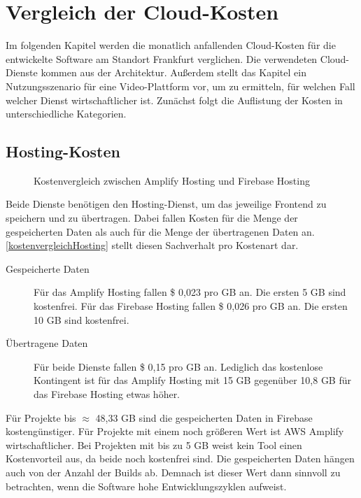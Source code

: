 \chapter{Vergleich der Cloud-Kosten}

Im folgenden Kapitel werden die monatlich anfallenden Cloud-Kosten \autocite{awsPricing} \autocite{gcpPricing} für die entwickelte Software am Standort Frankfurt verglichen. Die verwendeten Cloud-Dienste kommen aus der Architektur. Außerdem stellt das Kapitel ein Nutzungsszenario für eine Video-Plattform vor, um zu ermitteln, für welchen Fall welcher Dienst wirtschaftlicher ist. Zunächst folgt die Auflistung der Kosten in unterschiedliche Kategorien.

\section{Hosting-Kosten}

\begin{figure}%
    \centering
    \qquad
    \caption{Kostenvergleich zwischen Amplify Hosting und Firebase Hosting}%
    \label{kostenvergleichHosting}%
\end{figure}

Beide Dienste benötigen den Hosting-Dienst, um das jeweilige Frontend zu speichern und zu übertragen. Dabei fallen Kosten für die Menge der gespeicherten Daten als auch für die Menge der übertragenen Daten an. \autoref{kostenvergleichHosting} stellt diesen Sachverhalt pro Kostenart dar.

\begin{description}
  \item[Gespeicherte Daten] Für das Amplify Hosting fallen \$ 0,023 pro GB an. Die ersten 5 GB sind kostenfrei. Für das Firebase Hosting fallen \$ 0,026 pro GB an. Die ersten 10 GB sind kostenfrei.
  \item[Übertragene Daten] Für beide Dienste fallen \$ 0,15 pro GB an. Lediglich das kostenlose Kontingent ist für das Amplify Hosting mit 15 GB gegenüber 10,8 GB für das Firebase Hosting etwas höher.
\end{description}

Für Projekte bis $\approx$ 48,33 GB sind die gespeicherten Daten in Firebase kostengünstiger. Für Projekte mit einem noch größeren Wert ist \ac{AWS} Amplify wirtschaftlicher. Bei Projekten mit bis zu 5 GB weist kein Tool einen Kostenvorteil aus, da beide noch kostenfrei sind. Die gespeicherten Daten hängen auch von der Anzahl der Builds ab. Demnach ist dieser Wert dann sinnvoll zu betrachten, wenn die Software hohe Entwicklungszyklen aufweist.


